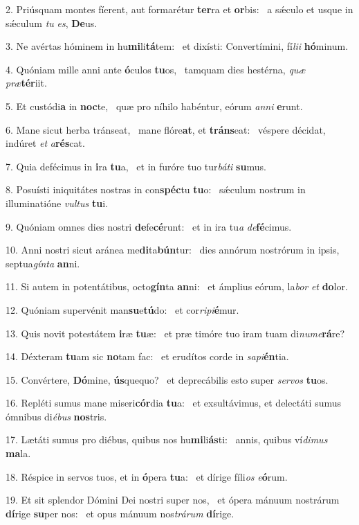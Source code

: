 2. Priúsquam montes fíerent, aut formarétur \textbf{ter}ra et \textbf{or}bis: \ast\  a sǽculo et usque in sǽculum \textit{tu} \textit{es}, \textbf{De}us.\

3. Ne avértas hóminem in hu\textbf{mi}li\textbf{tá}tem: \ast\  et dixísti: Convertímini, fí\textit{li}\textit{i} \textbf{hó}minum.\

4. Quóniam mille anni ante \textbf{ó}culos \textbf{tu}os, \ast\  tamquam dies hestérna, \textit{quæ} \textit{præ}\textbf{tér}iit.\

5. Et custódi\textbf{a} in \textbf{noc}te, \ast\  quæ pro níhilo habéntur, eórum \textit{an}\textit{ni} \textbf{e}runt.\

6. Mane sicut herba tránseat, \dag\  mane flóre\textbf{at}, et \textbf{tráns}eat: \ast\  véspere décidat, indúret \textit{et} \textit{a}\textbf{rés}cat.\

7. Quia defécimus in \textbf{i}ra \textbf{tu}a, \ast\  et in furóre tuo tur\textit{bá}\textit{ti} \textbf{su}mus.\

8. Posuísti iniquitátes nostras in con\textbf{spéc}tu \textbf{tu}o: \ast\  sǽculum nostrum in illuminatióne \textit{vul}\textit{tus} \textbf{tu}i.\

9. Quóniam omnes dies nostri \textbf{de}fe\textbf{cé}runt: \ast\  et in ira tu\textit{a} \textit{de}\textbf{fé}cimus.\

10. Anni nostri sicut aránea me\textbf{di}ta\textbf{bún}tur: \ast\  dies annórum nostrórum in ipsis, septua\textit{gín}\textit{ta} \textbf{an}ni.\

11. Si autem in potentátibus, octo\textbf{gín}ta \textbf{an}ni: \ast\  et ámplius eórum, la\textit{bor} \textit{et} \textbf{do}lor.\

12. Quóniam supervénit man\textbf{su}e\textbf{tú}do: \ast\  et cor\textit{ri}\textit{pi}\textbf{é}mur.\

13. Quis novit potestátem \textbf{i}ræ \textbf{tu}æ: \ast\  et præ timóre tuo iram tuam di\textit{nu}\textit{me}\textbf{rá}re?\

14. Déxteram \textbf{tu}am sic \textbf{no}tam fac: \ast\  et erudítos corde in \textit{sa}\textit{pi}\textbf{én}tia.\

15. Convértere, \textbf{Dó}mine, \textbf{ús}quequo? \ast\  et deprecábilis esto super \textit{ser}\textit{vos} \textbf{tu}os.\

16. Repléti sumus mane miseri\textbf{cór}dia \textbf{tu}a: \ast\  et exsultávimus, et delectáti sumus ómnibus di\textit{é}\textit{bus} \textbf{nos}tris.\

17. Lætáti sumus pro diébus, quibus nos hu\textbf{mi}li\textbf{ás}ti: \ast\  annis, quibus ví\textit{di}\textit{mus} \textbf{ma}la.\

18. Réspice in servos tuos, et in \textbf{ó}pera \textbf{tu}a: \ast\  et dírige fíli\textit{os} \textit{e}\textbf{ó}rum.\

19. Et sit splendor Dómini Dei nostri super nos, \dag\  et ópera mánuum nostrárum \textbf{dí}rige \textbf{su}per nos: \ast\  et opus mánuum nos\textit{trá}\textit{rum} \textbf{dí}rige.\

